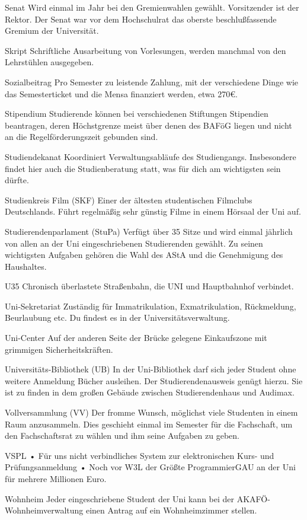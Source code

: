 Senat
Wird einmal im Jahr bei den Gremienwahlen gewählt. Vorsitzender ist der Rektor. Der Senat war vor dem Hochschulrat das oberste beschlußfassende Gremium der Universität.

Skript
Schriftliche Ausarbeitung von Vorlesungen, werden manchmal von den Lehrstühlen ausgegeben.

Sozialbeitrag
Pro Semester zu leistende Zahlung, mit der verschiedene Dinge wie das Semesterticket und die Mensa finanziert werden, etwa 270€.

Stipendium
Studierende können bei verschiedenen Stiftungen Stipendien beantragen, deren Höchstgrenze meist über denen des BAFöG liegen und nicht an die Regelförderungszeit gebunden sind.

Studiendekanat
Koordiniert Verwaltungsabläufe des Studiengangs. Insbesondere findet hier auch die Studienberatung statt, was für dich am wichtigsten sein dürfte.

Studienkreis Film (SKF)
Einer der ältesten studentischen Filmclubs Deutschlands. Führt regelmäßig sehr günstig Filme in einem Hörsaal der Uni auf.

Studierendenparlament (StuPa)
Verfügt über 35 Sitze und wird einmal jährlich von allen an der Uni eingeschriebenen Studierenden gewählt. Zu seinen wichtigsten Aufgaben gehören die Wahl des AStA und die Genehmigung des Haushaltes. 

U35
Chronisch überlastete Straßenbahn, die UNI und Hauptbahnhof verbindet.

Uni-Sekretariat
Zuständig für Immatrikulation, Exmatrikulation, Rückmeldung, Beurlaubung etc. Du findest es in der Universitätsverwaltung.

Uni-Center
Auf der anderen Seite der Brücke gelegene Einkaufszone mit grimmigen Sicherheitskräften.

Universitäts-Bibliothek (UB)
In der Uni-Bibliothek darf sich jeder Student ohne weitere Anmeldung Bücher ausleihen. Der Studierendenausweis genügt hierzu. Sie ist zu finden in dem großen Gebäude zwischen Studierendenhaus und Audimax.

Vollversammlung (VV)
Der fromme Wunsch, möglichst viele Studenten in einem Raum anzusammeln. Dies geschieht einmal im Semester für die Fachschaft, um den Fachschaftsrat zu wählen und ihm seine Aufgaben zu geben.

VSPL
•	Für uns nicht verbindliches System zur elektronischen Kurs- und Prüfungsanmeldung
•	Noch vor W3L der Größte ProgrammierGAU an der Uni für mehrere Millionen Euro.

Wohnheim
Jeder eingeschriebene Student der Uni kann bei der AKAFÖ-Wohnheimverwaltung einen Antrag auf ein Wohnheimzimmer stellen.